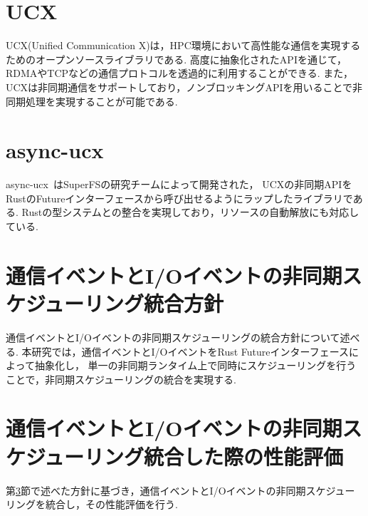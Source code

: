 \documentclass[a4paper,11pt,openany]{jreport}
\begin{document}
\section{UCX}
UCX(Unified Communication X)は，HPC環境において高性能な通信を実現するためのオープンソースライブラリである.
高度に抽象化されたAPIを通じて，RDMAやTCPなどの通信プロトコルを透過的に利用することができる.
また，UCXは非同期通信をサポートしており，ノンブロッキングAPIを用いることで非同期処理を実現することが可能である.

\section{async-ucx}
async-ucx~\cite{async-ucx}はSuperFSの研究チームによって開発された，
UCXの非同期APIをRustのFutureインターフェースから呼び出せるようにラップしたライブラリである.
Rustの型システムとの整合を実現しており，リソースの自動解放にも対応している.


\section{通信イベントとI/Oイベントの非同期スケジューリング統合方針}\label{sec:policy}
通信イベントとI/Oイベントの非同期スケジューリングの統合方針について述べる.
本研究では，通信イベントとI/OイベントをRust Futureインターフェースによって抽象化し，
単一の非同期ランタイム上で同時にスケジューリングを行うことで，非同期スケジューリングの統合を実現する.



\section{通信イベントとI/Oイベントの非同期スケジューリング統合した際の性能評価}\label{sec:io_rpc_eval}
第\ref{sec:policy}節で述べた方針に基づき，通信イベントとI/Oイベントの非同期スケジューリングを統合し，その性能評価を行う.
\end{document}
